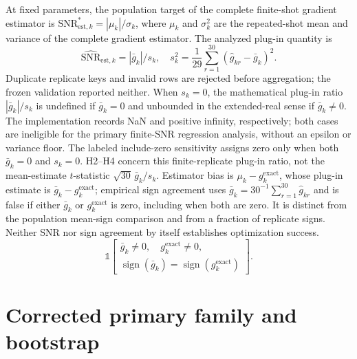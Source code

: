\documentclass[pdflatex,sn-basic,Numbered]{sn-jnl}
\begin{document}
At fixed parameters, the population target of the complete finite-shot gradient estimator is $\mathrm{SNR}^{*}_{\mathrm{est},k}=|\mu_k|/\sigma_k$, where $\mu_k$ and $\sigma_k^2$ are the repeated-shot mean and variance of the complete gradient estimator. The analyzed plug-in quantity is
\[
\widehat{\mathrm{SNR}}_{\mathrm{est},k}=|\bar g_k|/s_k,
\quad s_k^2=\frac{1}{29}\sum_{r=1}^{30}(\hat g_{kr}-\bar g_k)^2.
\]
Duplicate replicate keys and invalid rows are rejected before aggregation; the frozen validation reported neither. When $s_k=0$, the mathematical plug-in ratio $|\bar g_k|/s_k$ is undefined if $\bar g_k=0$ and unbounded in the extended-real sense if $\bar g_k\ne0$. The implementation records NaN and positive infinity, respectively; both cases are ineligible for the primary finite-SNR regression analysis, without an epsilon or variance floor. The labeled include-zero sensitivity assigns zero only when both $\bar g_k=0$ and $s_k=0$. H2--H4 concern this finite-replicate plug-in ratio, not the mean-estimate $t$-statistic $\sqrt{30}\,\bar g_k/s_k$. Estimator bias is $\mu_k-g_k^{\mathrm{exact}}$, whose plug-in estimate is $\bar g_k-g_k^{\mathrm{exact}}$; empirical sign agreement uses $\bar g_k=30^{-1}\sum_{r=1}^{30}\hat g_{kr}$ and is false if either $\bar g_k$ or $g_k^{\mathrm{exact}}$ is zero, including when both are zero. It is distinct from the population mean-sign comparison and from a fraction of replicate signs. Neither SNR nor sign agreement by itself establishes optimization success.
\[
\mathbb{1}\!\left[\begin{gathered}
\bar g_k\ne0,\quad g_k^{\mathrm{exact}}\ne0,\\
\operatorname{sign}(\bar g_k)=\operatorname{sign}(g_k^{\mathrm{exact}})
\end{gathered}\right].
\]

\section{Corrected primary family and bootstrap}
\end{document}
